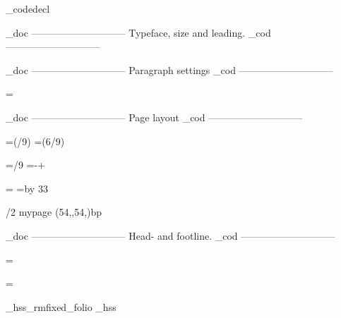 \_codedecl 

    \_doc -----------------------------
    Typeface, size and leading.
    \_cod -----------------------------

\fontfam[ebgaramond]
\typosize[11/14]

\def\ChapRed{\setcmykcolor{0 1 1 0.10}}

    \_doc -----------------------------
    Paragraph settings
    \_cod -----------------------------

\parskip=0pt
\parindent=\baselineskip

\relax
{}\relax


    \_doc -----------------------------
    Page layout
    \_cod -----------------------------



\newdimen\pagewidth     \pagewidth=6in
\newdimen\spinemargin   \spinemargin=\dimexpr(\pagewidth/9)\relax
\newdimen\measure       \measure=\dimexpr(6\pagewidth/9)

\newdimen\pageheight    \pageheight=9in 
\newdimen\depth         \depth=6in     
\newdimen\topmargin     \topmargin=/9\relax
\headlinedist=\dimexpr\baselineskip-\topskip+\baselineskip\relax
{}\baselineskip

%

\hsize=\measure
\vsize=\topskip \advance\vsize by 33\baselineskip %

\margins/2 mypage (54,,54,)bp

    \_doc -----------------------------
    Head- and footline.
    \_cod -----------------------------

\newif\ifheadline \headlinetrue
\newif\iffootline \footlinetrue

\def\_runningchap{}

\headline={%
    \ifheadline
        \ifodd\pageno
            \hss{\it \_runningchap}\hss
        \else
            \hss{\it The Man who was Thursday}\hss
        \fi
    \else
        \global\headlinetrue
    \fi    
}

\footline={%
    \iffootline
        \ifodd\pageno
            \_hss\_rmfixed\currvar \_folio \_hss%
        \else
            \_hss\_rmfixed\setff{+onum,+pnum}\currvar \_folio \_hss%
        \fi
    \else
        \global\footlinetrue
    \fi
}

